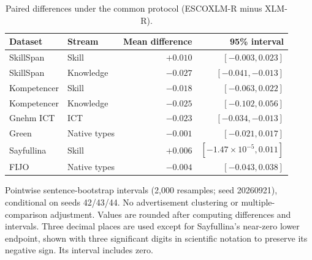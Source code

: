 \begin{table}[H]
\centering\small
\caption{Paired differences under the common protocol (ESCOXLM-R minus XLM-R).}
\label{tab:external-common-ci}
\begin{tabularx}{\linewidth}{@{}L P{.19\linewidth}rr@{}}
\toprule
Dataset & Stream & Mean difference & 95\% interval \\
\midrule
SkillSpan & Skill & $+0.010$ & $[-0.003, 0.023]$ \\
SkillSpan & Knowledge & $-0.027$ & $[-0.041, -0.013]$ \\
Kompetencer & Skill & $-0.018$ & $[-0.063, 0.022]$ \\
Kompetencer & Knowledge & $-0.025$ & $[-0.102, 0.056]$ \\
Gnehm ICT & ICT & $-0.023$ & $[-0.034, -0.013]$ \\
Green & Native types & $-0.001$ & $[-0.021, 0.017]$ \\
Sayfullina & Skill & $+0.006$ & $[-1.47\times10^{-5}, 0.011]$ \\
FIJO & Native types & $-0.004$ & $[-0.043, 0.038]$ \\
\bottomrule
\end{tabularx}
\par\smallskip\RaggedRight\footnotesize Pointwise sentence-bootstrap intervals (2,000 resamples; seed 20260921), conditional on seeds 42/43/44. No advertisement clustering or multiple-comparison adjustment. Values are rounded after computing differences and intervals. Three decimal places are used except for Sayfullina's near-zero lower endpoint, shown with three significant digits in scientific notation to preserve its negative sign. Its interval includes zero.
\end{table}

